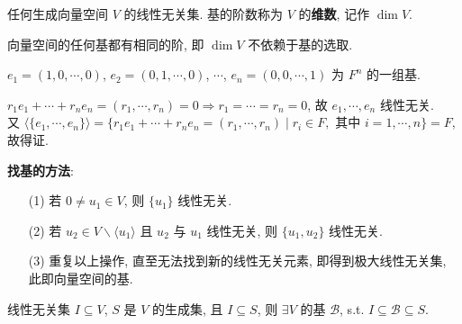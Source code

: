 \documentclass{note}
\begin{document}
\begin{df}[基]
    任何生成向量空间 $V$ 的线性无关集. 基的阶数称为 $V$ 的\textbf{维数}, 记作 $\dim V$.
\end{df}

\begin{thm}[(课本定理 1.12)]
    向量空间的任何基都有相同的阶, 即 $\dim V$ 不依赖于基的选取.
\end{thm}

\begin{eg}
    $e_1=(1,0,\cdots,0)$, $e_2=(0,1,\cdots,0)$, $\cdots$, $e_n=(0,0,\cdots,1)$ 为 $F^n$ 的一组基.
\end{eg}
\begin{pf}
    $r_1e_1+\cdots+r_ne_n=(r_1,\cdots,r_n)=0\Longrightarrow r_1=\cdots=r_n=0$, 故 $e_1,\cdots,e_n$ 线性无关.\\
    又 $\langle\{e_1,\cdots,e_n\}\rangle=\{r_1e_1+\cdots+r_ne_n=(r_1,\cdots,r_n)\mid r_i\in F,$ 其中 $i=1,\cdots,n\}=F$, 故得证.
\end{pf}

\textbf{找基的方法}:
\begin{itemize}
    \item[(1)] 若 $0\neq u_1\in V$, 则 $\{u_1\}$ 线性无关.
    \item[(2)] 若 $u_2\in V\backslash\langle u_1\rangle$ 且 $u_2$ 与 $u_1$ 线性无关, 则 $\{u_1,u_2\}$ 线性无关.
    \item[(3)] 重复以上操作, 直至无法找到新的线性无关元素, 即得到极大线性无关集, 此即向量空间的基.
\end{itemize}

\begin{thm}[(课本定理 1.9)]
    线性无关集 $I\subseteq V$, $S$ 是 $V$ 的生成集, 且 $I\subseteq S$, 则 $\exists V$ 的基 $\mathcal{B}$, s.t. $I\subseteq\mathcal{B}\subseteq S$.
\end{thm}
\end{document}
